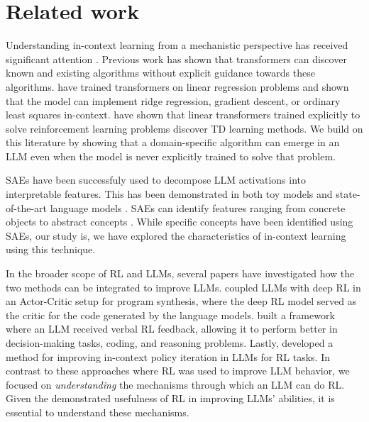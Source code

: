 \documentclass{article} %
\begin{document}
\section{Related work}

Understanding in-context learning from a mechanistic perspective has received significant attention \citep{garg2022can, vonoswald2023transformerslearnincontextgradient,dai2023gptlearnincontextlanguage, ahn2023transformerslearnimplementpreconditioned}. Previous work has shown that transformers can discover known and existing algorithms without explicit guidance towards these algorithms. \citet{akyürek2023learningalgorithmincontextlearning} have trained transformers on linear regression problems and shown that the model can implement ridge regression, gradient descent, or ordinary least squares in-context. \citet{wang2024transformerslearntemporaldifference} have shown that linear transformers trained explicitly to solve reinforcement learning problems discover TD learning methods. We build on this literature by showing that a domain-specific algorithm can emerge in an LLM even when the model is never explicitly trained to solve that problem.

SAEs have been successfuly used to decompose LLM activations into interpretable features. This has been demonstrated in both toy models \citep{cunningham2023sparse,bricken_towards_2023} and state-of-the-art language models \citep{gao2024scaling}. SAEs can identify features ranging from concrete objects to abstract concepts \citep{templeton2024scaling}. While specific concepts have been identified using SAEs, our study is, we have explored the characteristics of in-context learning using this technique.

In the broader scope of RL and LLMs, several papers have investigated how the two methods can be integrated to improve LLMs.  \citet{le2022coderlmasteringcodegeneration} coupled LLMs with deep RL in an Actor-Critic \citep{konda1999actor} setup for program synthesis, where the deep RL model served as the critic for the code generated by the language models. \citet{shinn2024reflexion} built a framework where an LLM received verbal RL feedback, allowing it to perform better in decision-making tasks, coding, and reasoning problems. Lastly, \citet{brooks2022context} developed a method for improving in-context policy iteration in LLMs for RL tasks. In contrast to these approaches where RL was used to improve LLM behavior, we focused on \textit{understanding} the mechanisms through which an LLM can do RL. Given the demonstrated usefulness of RL in improving LLMs' abilities, it is essential to understand these mechanisms.
\end{document}
